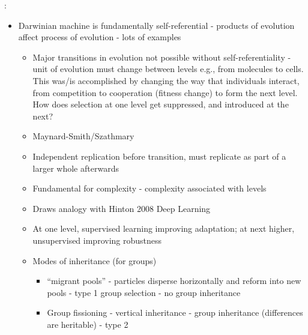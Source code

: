 \autocite{Watson2015}:
\begin{itemize}
	\item
	
	Darwinian machine is fundamentally self-referential - products of
	evolution affect process of evolution - lots of examples
	
	
	\begin{itemize}
		\item
		
		Major transitions in evolution not possible without
		self-referentiality - unit of evolution must change between levels
		e.g., from molecules to cells. This was/is accomplished by changing
		the way that individuals interact, from competition to cooperation
		(fitness change) to form the next level. How does selection at one
		level get suppressed, and introduced at the next?
		
		\item
		
		Maynard-Smith/Szathmary
		
		\item
		
		Independent replication before transition, must replicate as part of
		a larger whole afterwards
		
		\item
		
		Fundamental for complexity - complexity associated with levels
		
		\item
		
		Draws analogy with Hinton 2008 Deep Learning
		
		\item
		
		At one level, supervised learning improving adaptation; at next
		higher, unsupervised improving robustness
		
		\item
		
		Modes of inheritance (for groups)
		
		
		\begin{itemize}
			\item
			
			``migrant pools'' - particles disperse horizontally and reform
			into new pools - type 1 group selection - no group inheritance
			
			\item
			
			Group fissioning - vertical inheritance - group inheritance
			(differences are heritable) - type 2
			
		\end{itemize}
	\end{itemize}
\end{itemize}



